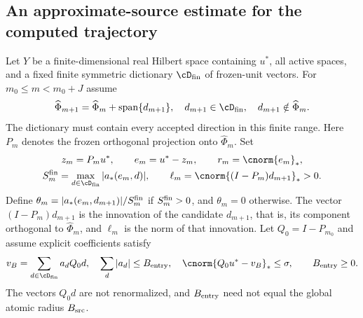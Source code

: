 \documentclass[11pt]{article}
\theoremstyle{remark}
\begin{document}
\subsection{An approximate-source estimate for the computed trajectory}
\label{sec:c5-source}

Let $Y$ be a finite-dimensional real Hilbert space containing $u^*$,
all active spaces, and a fixed finite symmetric dictionary
$\cD_{\rm fin}$ of frozen-unit vectors. For $m_0\leq m<m_0+J$ assume
\begin{equation}
 \widehat\Phi_{m+1}=\widehat\Phi_m+\operatorname{span}\{d_{m+1}\},
 \quad d_{m+1}\in\cD_{\rm fin},\quad d_{m+1}\notin\widehat\Phi_m .
 \label{eq:c5-spaces}
\end{equation}
The dictionary must contain every accepted direction in this finite range.
Here $P_m$ denotes the frozen orthogonal projection onto $\widehat\Phi_m$.
Set
\[
 \begin{gathered}
 z_m=P_mu^*,\qquad e_m=u^*-z_m,\qquad r_m=\cnorm{e_m}_*,\\
 S_m^{\rm fin}=\max_{d\in\cD_{\rm fin}}|a_*(e_m,d)|,\qquad
 \ell_m=\cnorm{(I-P_m)d_{m+1}}_*>0 .
 \end{gathered}
\]
Define $\theta_m=|a_*(e_m,d_{m+1})|/S_m^{\rm fin}$ if
$S_m^{\rm fin}>0$, and $\theta_m=0$ otherwise.
The vector $(I-P_m)d_{m+1}$ is the innovation of the candidate
$d_{m+1}$, that is, its component orthogonal to $\widehat\Phi_m$, and
$\ell_m$ is the norm of that innovation.
Let $Q_0=I-P_{m_0}$ and assume explicit coefficients satisfy
\begin{equation}
 v_B=\sum_{d\in\cD_{\rm fin}}a_dQ_0d,\quad
 \sum_d|a_d|\leq B_{\rm entry},\quad
 \cnorm{Q_0u^*-v_B}_*\leq\sigma,\qquad B_{\rm entry}\geq0.
 \label{eq:c5-entry-source}
\end{equation}
The vectors $Q_0d$ are not renormalized, and $B_{\rm entry}$
need not equal the global atomic radius $B_{\rm src}$.
\end{document}
